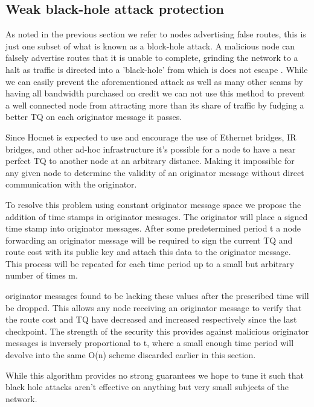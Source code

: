 \documentclass[11pt]{article}
\begin{document}
    \subsection{Weak black-hole attack protection} \label{blackhole}
    
               As noted in the previous section we refer to nodes advertising false routes, this is just one subset of what is known as a block-hole attack. A malicious node can falsely advertise routes that it is unable to complete, grinding the network to a halt as traffic is directed into a 'black-hole' from which is does not escape \cite{routesec}. While we can easily prevent the aforementioned attack as well as many other scams by having all bandwidth purchased on credit we can not use this method to prevent a well connected node from attracting more than its share of traffic by fudging a better TQ on each originator message it passes.
               
               Since Hocnet is expected to use and encourage the use of Ethernet bridges, IR bridges, and other ad-hoc infrastructure it's possible for a node to have a near perfect TQ to another node at an arbitrary distance. Making it impossible for any given node to determine the validity of an originator message without direct communication with the originator.
               
               To resolve this problem using constant originator message space we propose the addition of time stamps in originator messages. The originator will place a signed time stamp into originator messages. After some predetermined period t a node forwarding an originator message will be required to sign the current TQ and route cost with its public key and attach this data to the originator message. This process will be repeated for each time period up to a small but arbitrary number of times m.
               
               originator messages found to be lacking these values after the prescribed time will be dropped. This allows any node receiving an originator message to verify that the route cost and TQ have decreased and increased respectively since the last checkpoint. The strength of the security this provides against malicious originator messages is inversely proportional to t, where a small enough time period will devolve into the same O(n) scheme discarded earlier in this section. 
               
               While this algorithm provides no strong guarantees we hope to tune it such that black hole attacks aren't effective on anything but very small subjects of the network. 
    
\end{document}
